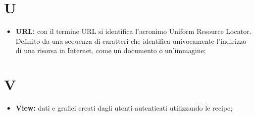 	\section*{\Huge U} %
		\begin{itemize}
			\item \textbf{URL:} con il termine URL si identifica l’acronimo Uniform Resource Locator. Definito da una sequenza di caratteri che identifica univocamente l’indirizzo di una risorsa in Internet, come un documento o un’immagine;
		\end{itemize}

	\section*{\Huge V} %
		\begin{itemize}
			\item \textbf{View:} dati e grafici creati dagli utenti autenticati utilizzando le recipe;
		\end{itemize}


